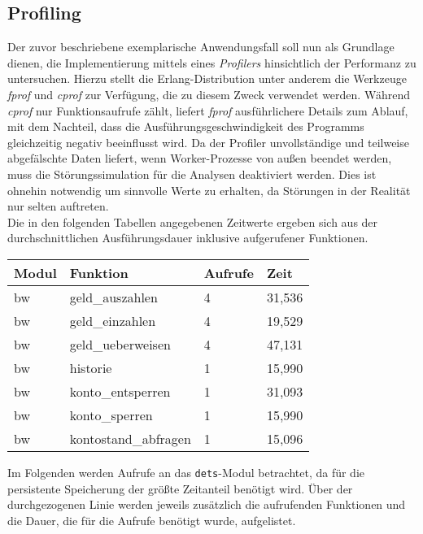 \subsection{Profiling}
Der zuvor beschriebene exemplarische Anwendungsfall soll nun als Grundlage dienen, die Implementierung mittels eines \textit{Profilers} hinsichtlich der Performanz zu untersuchen. Hierzu stellt die Erlang-Distribution unter anderem die Werkzeuge \textit{fprof} und \textit{cprof} zur Verfügung, die zu diesem Zweck verwendet werden. Während \textit{cprof} nur Funktionsaufrufe zählt, liefert \textit{fprof} ausführlichere Details zum Ablauf, mit dem Nachteil, dass die Ausführungsgeschwindigkeit des Programms gleichzeitig negativ beeinflusst wird. Da der Profiler unvollständige und teilweise abgefälschte Daten liefert, wenn Worker-Prozesse von außen beendet werden, muss die Störungssimulation für die Analysen deaktiviert werden. Dies ist ohnehin notwendig um sinnvolle Werte zu erhalten, da Störungen in der Realität nur selten auftreten.\\
Die in den folgenden Tabellen angegebenen Zeitwerte ergeben sich aus der durchschnittlichen Ausführungsdauer inklusive aufgerufener Funktionen.

\begin{center}
	\begin{tabular}{p{1.2cm}|p{5cm}|p{2cm}|p{2cm}}
		Modul & Funktion & Aufrufe & Zeit \\
		\hline
		\hline
		bw & geld\_auszahlen & 4 & 31,536 \\
		bw & geld\_einzahlen & 4 & 19,529 \\
		bw & geld\_ueberweisen & 4 & 47,131 \\
		bw & historie & 1 & 15,990 \\
		bw & konto\_entsperren & 1 & 31,093 \\
		bw & konto\_sperren & 1 & 15,990 \\
		bw & kontostand\_abfragen & 1 & 15,096 \\
	\end{tabular}
\end{center}

Im Folgenden werden Aufrufe an das \texttt{dets}-Modul betrachtet, da für die persistente Speicherung der größte Zeitanteil benötigt wird. Über der durchgezogenen Linie werden jeweils zusätzlich die aufrufenden Funktionen und die Dauer, die für die Aufrufe benötigt wurde, aufgelistet.

